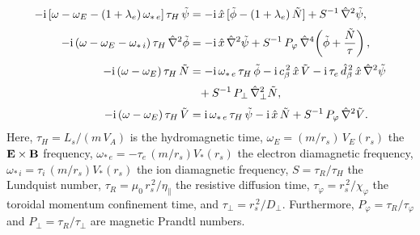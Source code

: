 \documentclass[12pt,prb,aps]{revtex4-1}
\begin{document}
\begin{align}\label{e37}
-{\rm i}\,[\omega-\omega_E -(1+\lambda_e)\,\omega_{\ast\,e}]\,\tau_H\,\tilde{\psi} &= -{\rm i} \,\hat{x}\,[\tilde{\phi}-(1+\lambda_e)\,\tilde{N}] + S^{-1}\,\hat{\nabla}^2\tilde{\psi},\\[0.5ex]
-{\rm i}\,(\omega-\omega_E-\omega_{\ast\,i})\,\tau_H\,\hat{\nabla}^2\tilde{\phi} &= -{\rm i}\,\hat{x}\,\hat{\nabla}^2\tilde{\psi}+S^{-1}\,P_\varphi\,\hat{\nabla}^4\!\left(\tilde{\phi} + \frac{\tilde{N}}{\tau}\right),\\[0.5ex]
-{\rm i}\,(\omega-\omega_E)\,\tau_H\,\tilde{N} &= -{\rm i}\,\omega_{\ast\,e}\,\tau_H\,\tilde{\phi}-{\rm i}\,c_\beta^{\,2}\,\hat{x}\,\tilde{V} - {\rm i}\,\tau_e\,\hat{d}_\beta^{\,2}\,\hat{x}\,\hat{\nabla}^2\tilde{\psi}\nonumber\\[0.5ex]
&\phantom{=} + S^{-1}\,P_\perp\,\hat{\nabla}_\perp^2 \tilde{N},\\[0.5ex]
-{\rm i}\,(\omega-\omega_E)\,\tau_H\,\tilde{V} &= {\rm i}\,\omega_{\ast\,e}\,\tau_H\,\tilde{\psi} - {\rm i}\,\hat{x}\,\tilde{N}
+ S^{-1}\,P_\varphi\,\hat{\nabla}^2\tilde{V}.\label{e40}
\end{align}
Here, 
$\tau_H = L_s/(m\,V_A)$ 
is the  hydromagnetic time, 
$\omega_E =(m/r_s)\,V_E(r_s)$
  the 
 ${\bf E}\times {\bf B}$ frequency, 
$\omega_{\ast\,e} = -\tau_e\,(m/r_s)V_\ast(r_s)$
the 
   electron diamagnetic
frequency,
$\omega_{\ast\,i} =\tau_i\,(m/r_s)V_\ast(r_s)$
 the  ion diamagnetic
frequency, 
$S=\tau_R/\tau_H$
 the  Lundquist number, 
$\tau_R = \mu_0\,r_s^{\,2}/\eta_\parallel$
 the
 resistive diffusion time, 
$\tau_\varphi
= r_s^{\,2}/\chi_\varphi$
the  toroidal momentum confinement time, and 
$\tau_\perp = r_s^{\,2}/D_\perp$.
  Furthermore, $P_\varphi = \tau_R/\tau_\varphi$ and $P_\perp = \tau_R/\tau_\perp$ are magnetic Prandtl numbers.
\end{document}
